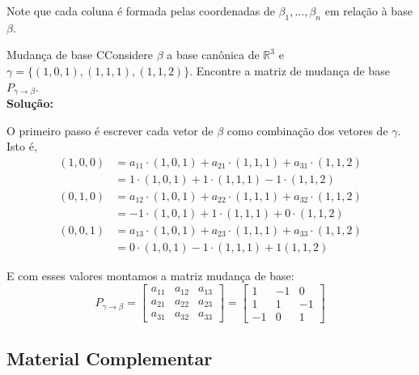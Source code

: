 \documentclass[12pt,a4paper]{article}
\begin{document}
Note que cada coluna é formada pelas coordenadas de $\beta_1, \ldots, \beta_n$ em relação à base $\beta$. 

\newpage
\begin{exemplo}{Mudança de base}
CConsidere $\beta$ a base canônica de $\mathbb{R}^3$ e $\gamma = \{(1,0,1),(1,1,1),(1,1,2)\}$. Encontre a matriz de mudança de base $P_{\gamma \to \beta}$. \\

\textbf{Solução:}

O primeiro passo é escrever cada vetor de $\beta$ como combinação dos vetores de $\gamma$. Isto é,
\begin{equation*}
\begin{aligned}
(1,0,0) &= a_{11} \cdot (1,0,1) + a_{21} \cdot (1,1,1) + a_{31} \cdot (1,1,2) \\
&= 1 \cdot (1,0,1) + 1 \cdot (1,1,1) - 1 \cdot (1,1,2)
\end{aligned}
\end{equation*}
\begin{equation*}
\begin{aligned}
(0,1,0) &= a_{12} \cdot (1,0,1) + a_{22} \cdot (1,1,1) + a_{32} \cdot (1,1,2) \\
&= -1 \cdot (1,0,1) + 1 \cdot (1,1,1) + 0 \cdot (1,1,2)
\end{aligned}
\end{equation*}
\begin{equation*}
\begin{aligned}
(0,0,1) &= a_{13} \cdot  (1,0,1) + a_{23} \cdot  (1,1,1) + a_{33}  \cdot (1,1,2) \\
&= 0 \cdot (1,0,1) - 1 \cdot (1,1,1) + 1 (1,1,2)
\end{aligned}
\end{equation*}

E com esses valores montamos a matriz mudança de base:
\[
P_{\gamma \to \beta} =
\begin{bmatrix}
a_{11} & a_{12} & a_{13} \\
a_{21} & a_{22} & a_{23} \\
a_{31} & a_{32} & a_{33}
\end{bmatrix}
=
\begin{bmatrix}
1 & -1 & 0 \\
1 & 1 & -1 \\
-1 & 0 & 1
\end{bmatrix}
\]
\end{exemplo}

\subsection{Material Complementar}
\end{document}
